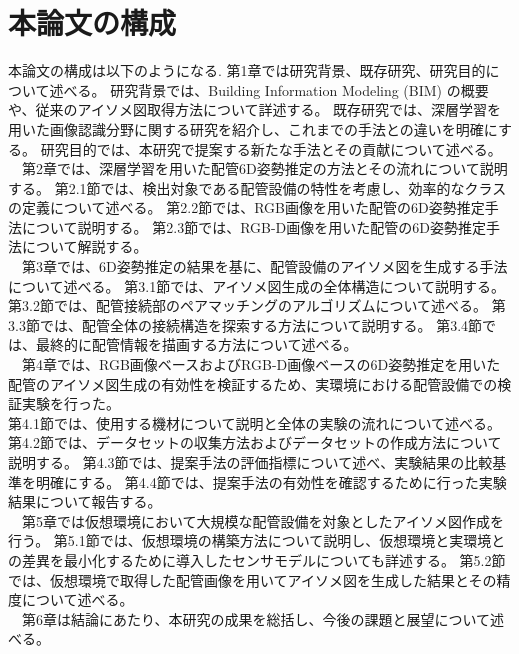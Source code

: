 \section{本論文の構成}
本論文の構成は以下のようになる.
第1章では研究背景、既存研究、研究目的について述べる。
研究背景では、Building Information Modeling (BIM) の概要や、従来のアイソメ図取得方法について詳述する。
既存研究では、深層学習を用いた画像認識分野に関する研究を紹介し、これまでの手法との違いを明確にする。
研究目的では、本研究で提案する新たな手法とその貢献について述べる。\\
　第2章では、深層学習を用いた配管6D姿勢推定の方法とその流れについて説明する。
第2.1節では、検出対象である配管設備の特性を考慮し、効率的なクラスの定義について述べる。
第2.2節では、RGB画像を用いた配管の6D姿勢推定手法について説明する。
第2.3節では、RGB-D画像を用いた配管の6D姿勢推定手法について解説する。\\
　第3章では、6D姿勢推定の結果を基に、配管設備のアイソメ図を生成する手法について述べる。
第3.1節では、アイソメ図生成の全体構造について説明する。
第3.2節では、配管接続部のペアマッチングのアルゴリズムについて述べる。
第3.3節では、配管全体の接続構造を探索する方法について説明する。
第3.4節では、最終的に配管情報を描画する方法について述べる。\\
　第4章では、RGB画像ベースおよびRGB-D画像ベースの6D姿勢推定を用いた配管のアイソメ図生成の有効性を検証するため、実環境における配管設備での検証実験を行った。\\
第4.1節では、使用する機材について説明と全体の実験の流れについて述べる。
第4.2節では、データセットの収集方法およびデータセットの作成方法について説明する。
第4.3節では、提案手法の評価指標について述べ、実験結果の比較基準を明確にする。
第4.4節では、提案手法の有効性を確認するために行った実験結果について報告する。\\
　第5章では仮想環境において大規模な配管設備を対象としたアイソメ図作成を行う。
第5.1節では、仮想環境の構築方法について説明し、仮想環境と実環境との差異を最小化するために導入したセンサモデルについても詳述する。
第5.2節では、仮想環境で取得した配管画像を用いてアイソメ図を生成した結果とその精度について述べる。\\
　第6章は結論にあたり、本研究の成果を総括し、今後の課題と展望について述べる。
